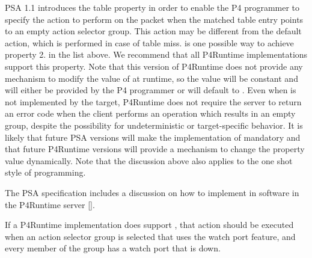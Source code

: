 \documentclass[11pt]{article}
\begin{document}
{%
PSA 1.1 introduces the  table property in order to
enable the P4 programmer to specify the action to perform on the packet when the
matched table entry points to an empty action selector group. This action may be
different from the default action, which is performed in case of table
miss.  is one possible way to achieve property 2. in the
list above. We recommend that all P4Runtime implementations support this
property. Note that this version of P4Runtime does not provide any mechanism to
modify the value of  at runtime, so the value will be
constant and will either be provided by the P4 programmer or will default to
. Even when  is not implemented by the target,
P4Runtime does not require the server to return an error code when the client
performs an operation which results in an empty group, despite the possibility
for undeterministic or target-specific behavior. It is likely that future PSA
versions will make the implementation of  mandatory and
that future P4Runtime versions will provide a mechanism to change the property
value dynamically. Note that the discussion above also applies to the one shot
style of programming.%

The PSA specification includes a discussion on how to implement
 in software in the P4Runtime server
[].%

If a P4Runtime implementation does support , that action
should be executed when an action selector group is selected that uses the watch
port feature, and every member of the group has a watch port that is down.%

}
\end{document}
